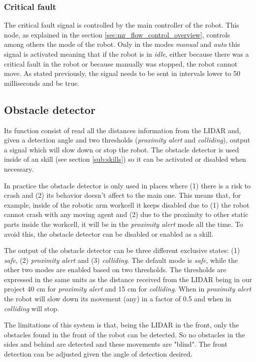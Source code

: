 		\subsubsection{Critical fault} %
		\label{ssub:mr_critical_fault}
		The critical fault signal is controlled by the main controller of the robot.
		This node, as explained in the section \ref{sec:mr_flow_control_overview}, controls among others the mode of the robot.
		Only in the modes \emph{manual} and \emph{auto} this signal is activated meaning that if the robot is in \emph{idle}, either because there was a critical fault in the robot or because manually was stopped, the robot cannot move.
		As stated previously, the signal needs to be sent in intervals lower to 50 milliseconds and be true.

	\subsection{Obstacle detector} %
	\label{sub:mr_obstacle_detector}
	Its function consist of read all the distances information from the LIDAR and, given a detection angle and two thresholds (\emph{proximity alert} and \emph{colliding}), output a signal which will slow down or stop the robot.
	The obstacle detector is used inside of an skill (see section \ref{sub:skills}) so it can be activated or disabled when necessary.

	In practice the obstacle detector is only used in places where (1) there is a risk to crash and (2) its behavior doesn't affect to the main one.
	This means that, for example, inside of the robotic arm workcell it keeps disabled due to (1) the robot cannot crash with any moving agent and (2) due to the proximity to other static parts inside the workcell, it will be in the \emph{proximity alert} mode all the time. 
	To avoid this, the obstacle detector can be disabled or enabled as a skill.

	The output of the obstacle detector can be three different exclusive states: (1) \emph{safe}, (2) \emph{proximity alert} and (3) \emph{colliding}. 
	The default mode is \emph{safe}, while the other two modes are enabled based on two thresholds.
	The thresholds are expressed in the same units as the distance received from the LIDAR being in our project 40 cm for \emph{proximity alert} and 15 cm for \emph{colliding}.
	When in \emph{proximity alert} the robot will slow down its movement (any) in a factor of 0.5 and when in \emph{colliding} will stop.

	The limitations of this system is that, being the LIDAR in the front, only the obstacles found in the front of the robot can be detected.
	So no obstacles in the sides and behind are detected and these movements are "blind".
	The front detection can be adjusted given the angle of detection desired.

